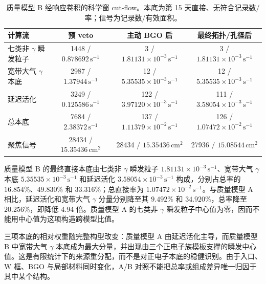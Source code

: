 \documentclass[11pt]{article}
\newcommand{\revblue}[1]{\textcolor{revisionblue}{#1}}
\newcommand{\cps}{\,\mathrm{s^{-1}}}
\begin{document}
\begin{table}[H]
\centering
\caption{质量模型 B 经响应卷积的科学窗 cut-flow。本底为第 15 天直接、无符合记录数/率；信号为记录数/有效面积。}
\label{tab:optimized_cutflow_zh}
\footnotesize
\begin{tabular}{lccc}
\toprule
计算流 & 预 veto & 主动 BGO 后 & 最终拓扑/孔径后 \\
\midrule
\revblue{七类非 $\gamma$ 瞬发粒子} & 1448 / $0.878692\cps$ & 3 / $1.81131\times10^{-3}\cps$ & 3 / $1.81131\times10^{-3}\cps$ \\
宽带大气 $\gamma$ 本底 & 2987 / $1.37944\cps$ & 12 / $5.35535\times10^{-3}\cps$ & 12 / $5.35535\times10^{-3}\cps$ \\
延迟活化 & 3249 / $0.125586\cps$ & 122 / $3.97120\times10^{-3}\cps$ & 111 / $3.58054\times10^{-3}\cps$ \\
总本底 & 7684 / $2.38372\cps$ & 137 / $1.11379\times10^{-2}\cps$ & 126 / $1.07472\times10^{-2}\cps$ \\
聚焦信号 & 28434 / $15.35436\,\mathrm{cm^2}$ & 28434 / $15.35436\,\mathrm{cm^2}$ & 27936 / $15.08544\,\mathrm{cm^2}$ \\
\bottomrule
\end{tabular}
\end{table}

质量模型 B 的最终直接本底由\revblue{七类非 $\gamma$ 瞬发粒子} $1.81131\times10^{-3}\cps$、宽带大气 $\gamma$ 本底 $5.35535\times10^{-3}\cps$ 和延迟活化 $3.58054\times10^{-3}\cps$ 构成，分别占总率的 $16.854\%$、$49.830\%$ 和 $33.316\%$；总直接率为 $1.07472\times10^{-2}\cps$。与质量模型 A 相比，延迟活化和宽带大气 $\gamma$ 分量分别降至其 $9.492\%$ 和 $34.920\%$，总率降至 $20.256\%$，即降低 4.94 倍。质量模型 A 的\revblue{七类非 $\gamma$ 瞬发粒子}中心值为零，因而不能用中心值为这项构造跨模型比值。

三项本底的相对权重随完整构型改变：质量模型 A 由延迟活化主导，而质量模型 B 中宽带大气 $\gamma$ 本底成为最大分量，并出现由三个正电子族模板支撑的瞬发中心值。这是有限统计下的来源重分配，而不是对正电子本底的稳健识别。由于入口、W 框、BGO 与局部材料同时变化，A/B 对照不能把总率或组成差异唯一归因于其中某个结构。
\end{document}
